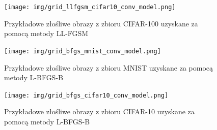 \documentclass[
    left=2.5cm,         %
    right=2.5cm,        %
    top=2.5cm,          %
    bottom=3cm,         %
    bindingoffset=6mm,  %
    nohyphenation=false %
]{eiti/eiti-thesis}
\begin{document}
\begin{figure}[H]
    \centering
    \texttt{[image: img/grid\_llfgsm\_cifar10\_conv\_model.png]}
    \caption{Przykładowe złośliwe obrazy z zbioru CIFAR-100 uzyskane za pomocą metody LL-FGSM}
    \label{fig:cifar10_grid_llfgsm}
\end{figure}

\begin{figure}[H]
    \centering
    \texttt{[image: img/grid\_bfgs\_mnist\_conv\_model.png]}
    \caption{Przykładowe złośliwe obrazy z zbioru MNIST uzyskane za pomocą metody L-BFGS-B}
\end{figure}
\begin{figure}[H]
    \centering
    \texttt{[image: img/grid\_bfgs\_cifar10\_conv\_model.png]}
    \caption{Przykładowe złośliwe obrazy z zbioru CIFAR-10 uzyskane za pomocą metody L-BFGS-B}
\end{figure}
\end{document}
